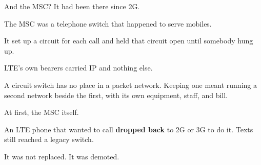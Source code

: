 %
\begin{frame}{And the MSC? It had been there since 2G.}
  \gonebox
    {The MSC was a telephone switch that happened to serve mobiles.

     \vspace{0.4em}
     It set up a circuit for each call and held that circuit open
     until somebody hung up.}
    {LTE's own bearers carried IP and nothing else.

     \vspace{0.4em}
     A circuit switch has no place in a packet network. Keeping one
     meant running a second network beside the first, with its own
     equipment, staff, and bill.}
    {At first, the MSC itself.

     \vspace{0.4em}
     An LTE phone that wanted to call \textbf{dropped back} to 2G or 3G to
     do it. Texts still reached a legacy switch.

     \vspace{0.4em}
     It was not replaced. It was demoted.}

  \vspace{0.5em}

\end{frame}

